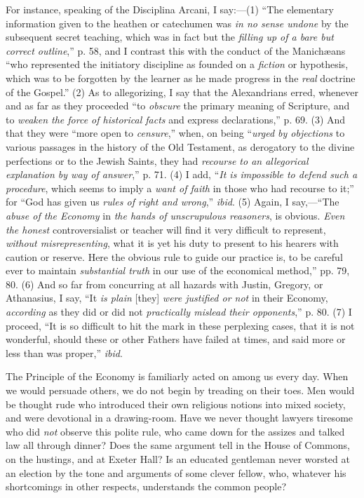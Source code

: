For instance, speaking of the Disciplina Arcani, I say:—(1) ``The
elementary information given to the heathen or catechumen was \emph{in no
sense undone} by the subsequent secret teaching, which was in fact
but the \emph{filling up of a bare but correct outline},'' p. 58,
and I contrast this with the conduct of the Manichæans ``who
represented the initiatory discipline as founded on a \emph{fiction} or
hypothesis, which was to be forgotten by the learner as he made progress
in the \emph{real} doctrine of the Gospel.'' (2) As to allegorizing,
I say that the Alexandrians erred, whenever and as far as they proceeded
``to \emph{obscure} the primary meaning of Scripture, and to \emph{weaken
the force of historical facts} and express declarations,'' p. 69.
(3) And that they were ``more open to \emph{censure},'' when, on
being ``\emph{urged by objections} to various passages in the
history of the Old Testament, as derogatory to the divine perfections or
to the Jewish Saints, they had \emph{recourse to an allegorical explanation
by way of answer},'' p. 71. (4) I add, ``\emph{It is impossible
to defend such a procedure}, which seems to imply a \emph{want of faith}
in those who had recourse to it;'' for ``God has given us \emph{rules
of right and wrong},'' \emph{ibid}. (5) Again, I say,—``The
\emph{abuse of the Economy} in
\emph{the hands of unscrupulous reasoners}, is
obvious. \emph{Even the honest} controversialist or teacher will find it
very difficult to represent, \emph{without misrepresenting}, what it is
yet his duty to present to his hearers with caution or reserve. Here the
obvious rule to guide our practice is, to be careful ever to maintain \emph{substantial truth} in our use of the economical method,'' pp. 79, 80.
(6) And so far from concurring at all hazards with Justin, Gregory, or Athanasius, I say, ``It \emph{is plain} [they] \emph{were justified or not} in their Economy, \emph{according}
as they did or did not \emph{practically mislead their opponents},''
p. 80. (7) I proceed, ``It is so difficult to hit the mark in these
perplexing cases, that it is not wonderful, should these or other
Fathers have failed at times, and said more or less than was
proper,'' \emph{ibid}.

The Principle of the Economy is familiarly acted on among us every
day. When we would persuade others, we do not begin by treading on their
toes. Men would be thought rude who introduced their own religious
notions into mixed society, and were devotional in a drawing-room. Have
we never thought lawyers tiresome who did \emph{not} observe this
polite rule, who came down for the assizes and talked law all
through dinner? Does the same argument tell in the House of Commons, on
the hustings, and at Exeter Hall? Is an educated gentleman never worsted
at an election by the tone and arguments of some clever fellow, who,
whatever his shortcomings in other respects, understands the common
people?

